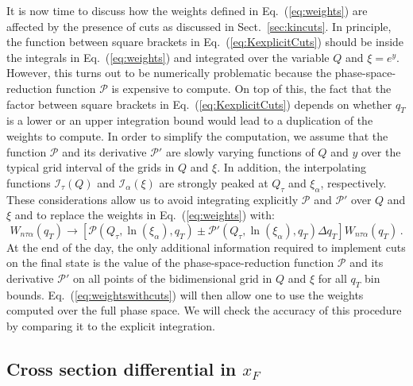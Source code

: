 \documentclass[10pt,a4paper]{article}
\begin{document}
It is now time to discuss how the weights defined in
Eq.~(\ref{eq:weights}) are affected by the presence of cuts as
discussed in Sect.~\ref{sec:kincuts}. In principle, the function
between square brackets in Eq.~(\ref{eq:KexplicitCuts}) should be
inside the integrals in Eq.~(\ref{eq:weights}) and integrated over the
variable $Q$ and $\xi=e^y$. However, this turns out to be numerically
problematic because the phase-space-reduction function $\mathcal{P}$
is expensive to compute. On top of this, the fact that the factor
between square brackets in Eq.~(\ref{eq:KexplicitCuts}) depends on
whether $q_T$ is a lower or an upper integration bound would lead to a
duplication of the weights to compute. In order to simplify the
computation, we assume that the function $\mathcal{P}$ and its
derivative $\mathcal{P}'$ are slowly varying functions of $Q$ and $y$
over the typical grid interval of the grids in $Q$ and $\xi$. In
addition, the interpolating functions $\mathcal{I}_\tau(Q)$ and
$\mathcal{I}_\alpha(\xi)$ are strongly peaked at $Q_\tau$ and
$\xi_\alpha$, respectively. These considerations allow us to avoid
integrating explicitly $\mathcal{P}$ and $\mathcal{P}'$ over $Q$ and
$\xi$ and to replace the weights in Eq.~(\ref{eq:weights}) with:
\begin{equation}\label{eq:weightswithcuts}
  \displaystyle  W_{n\tau\alpha}(q_T) \rightarrow \left[\mathcal{P}\left(Q_\tau,\ln(\xi_\alpha),q_{T}\right) \pm
  \mathcal{P}'\left(Q_\tau,\ln(\xi_\alpha),q_{T}\right)\Delta q_T\right] W_{n\tau\alpha}(q_T)\,.
\end{equation}
At the end of the day, the only additional information required to
implement cuts on the final state is the value of the
phase-space-reduction function $\mathcal{P}$ and its derivative
$\mathcal{P}'$ on all points of the bidimensional grid in $Q$ and
$\xi$ for all $q_T$ bin bounds. Eq.~(\ref{eq:weightswithcuts}) will
then allow one to use the weights computed over the full phase space.
We will check the accuracy of this procedure by comparing it to the
explicit integration.

\subsection{Cross section differential in $x_F$}
\end{document}
